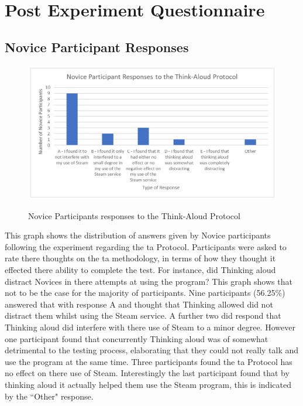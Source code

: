 \section{Post Experiment Questionnaire}
\subsection{Novice Participant Responses}
\begin{figure}[H]
\includegraphics[width=\linewidth]{Screenshots/DemographicsQuestionaires/noviceQuestionaireData/noviceTAP.png}
\label{NoviceTAP}
\caption{Novice Participants responses to the Think-Aloud Protocol}
\end{figure}

This graph shows the distribution of answers given by Novice participants following the experiment regarding the \gls{ta} Protocol. Participants were asked to rate there thoughts on the \gls{ta} methodology, in terms of how they thought it effected there ability to complete the test. For instance, did Thinking aloud distract Novices in there attempts at using the program? This graph shows that not to be the case for the majority of participants. Nine participants (56.25\%) answered that with response A and thought that Thinking allowed did not distract them whilst using the Steam service. A further two did respond that Thinking aloud did interfere with there use of Steam to a minor degree. However one participant found that concurrently Thinking aloud was of somewhat detrimental to the testing process, elaborating that they could not really talk and use the program at the same time. Three participants found the \gls{ta} Protocol has no effect on there use of Steam. Interestingly the last participant found that by thinking aloud it actually helped them use the Steam program, this is indicated by the ``Other" response. 

